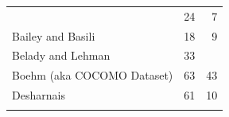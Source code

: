 \documentclass[]{book}
\begin{document}
\begin{longtable}[]{@{}lrr@{}}
\begin{minipage}[t]{0.44\columnwidth}
\end{minipage} & \begin{minipage}[t]{0.18\columnwidth}\raggedleft\strut
24\strut
\end{minipage} & \begin{minipage}[t]{0.18\columnwidth}\raggedleft\strut
7\strut
\end{minipage}\tabularnewline
\begin{minipage}[t]{0.44\columnwidth}\raggedright\strut
Bailey and Basili \citeyearpar{Bailey81}\strut
\end{minipage} & \begin{minipage}[t]{0.18\columnwidth}\raggedleft\strut
18\strut
\end{minipage} & \begin{minipage}[t]{0.18\columnwidth}\raggedleft\strut
9\strut
\end{minipage}\tabularnewline
\begin{minipage}[t]{0.44\columnwidth}\raggedright\strut
Belady and Lehman \citeyearpar{Belady79}\strut
\end{minipage} & \begin{minipage}[t]{0.18\columnwidth}\raggedleft\strut
33\strut
\end{minipage} & \begin{minipage}[t]{0.18\columnwidth}\raggedleft\strut
\strut
\end{minipage}\tabularnewline
\begin{minipage}[t]{0.44\columnwidth}\raggedright\strut
Boehm (aka COCOMO Dataset) \citeyearpar{Boehm81}\strut
\end{minipage} & \begin{minipage}[t]{0.18\columnwidth}\raggedleft\strut
63\strut
\end{minipage} & \begin{minipage}[t]{0.18\columnwidth}\raggedleft\strut
43\strut
\end{minipage}\tabularnewline
\begin{minipage}[t]{0.44\columnwidth}\raggedright\strut
Desharnais \citeyearpar{Desharnais88}\strut
\end{minipage} & \begin{minipage}[t]{0.18\columnwidth}\raggedleft\strut
61\strut
\end{minipage} & \begin{minipage}[t]{0.18\columnwidth}\raggedleft\strut
10\strut
\end{minipage}\tabularnewline
\begin{minipage}[t]{0.44\columnwidth}\raggedright\strut

\end{minipage}
\end{longtable}
\end{document}

